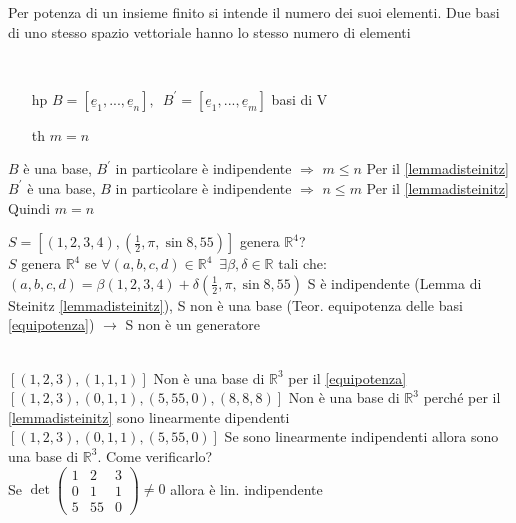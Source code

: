   \begin{teorema}\label{equipotenza}
    Per potenza di un insieme finito si intende il numero dei suoi
    elementi. Due basi di uno stesso spazio vettoriale hanno lo
    stesso numero di elementi
    \begin{dimostrazione}
      \phantom{}\\
      \begin{itemize}
        \item[hp]
          $B=[\underline{e}_1,...,\underline{e}_n],\phantom{1}B^{'}=[\underline{e}_1,...,\underline{e}_m]$
          basi di V
        \item[th] $m=n$
      \end{itemize}
      $B$ è una base, $B^{'}$ in particolare è indipendente
      $\Longrightarrow$ $m\leqslant n$ Per il \ref{lemmadisteinitz}\\
      $B^{'}$ è una base, $B$ in particolare è indipendente
      $\Longrightarrow$ $n\leqslant m$ Per il \ref{lemmadisteinitz}\\
      Quindi $m=n$
    \end{dimostrazione}
    \begin{esercizio}
      $S=[(1,2,3,4),(\frac{1}{2},\pi,\sin 8, 55)]$ genera $\mathbb{R}^4$?\\
      $S$ genera $\mathbb{R}^4$ se
      $\forall(a,b,c,d)\in\mathbb{R}^4\phantom{1}\exists\beta,\delta\in\mathbb{R}$
      tali che:\\
      $(a,b,c,d)=\beta(1,2,3,4)+\delta(\frac{1}{2},\pi,\sin 8, 55)$
      S è indipendente (Lemma di Steinitz \ref{lemmadisteinitz}), S
      non è una base (Teor. equipotenza delle basi \ref{equipotenza})
      $\longrightarrow$ S non è un generatore
    \end{esercizio}
    \begin{osservazione}
      \phantom{}\\
      $[(1,2,3),(1,1,1)]$ Non è una base di $\mathbb{R}^3$ per il
      \ref{equipotenza}\\
      $[(1,2,3),(0,1,1),(5,55,0),(8,8,8)]$ Non è una base di
      $\mathbb{R}^3$ perché per il \ref{lemmadisteinitz} sono
      linearmente dipendenti\\
      $[(1,2,3),(0,1,1),(5,55,0)]$ Se sono linearmente indipendenti
      allora sono una base di $\mathbb{R}^3$. Come verificarlo?\\
      Se $\det
      \begin{pmatrix}
        1 & 2 & 3\\
        0 & 1 & 1\\
        5 & 55& 0
      \end{pmatrix}\neq 0$ allora è lin. indipendente
    \end{osservazione}
  \end{teorema}

